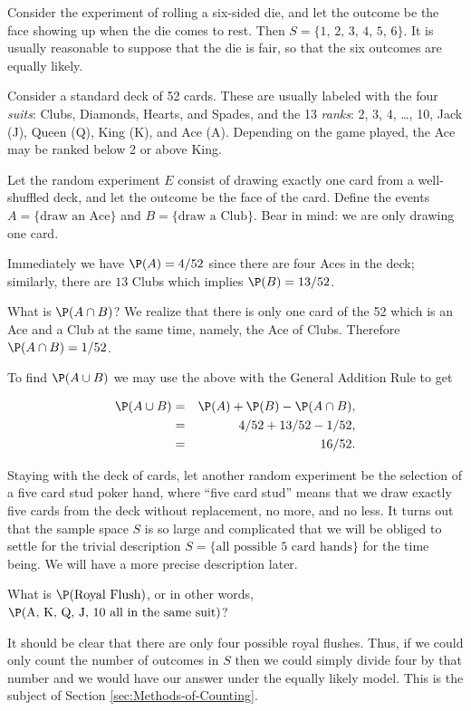 \documentclass[captions=tableheading]{scrbook}
\begin{document}
\begin{example}
Consider the experiment of rolling a six-sided die, and let the outcome be the face showing up when the die comes to rest. Then \( S = \{ 1,\,2,\,3,\,4,\,5,\,6 \} \). It is usually reasonable to suppose that the die is fair, so that the six outcomes are equally likely.
\end{example}

\begin{example}
Consider a standard deck of 52 cards. These are usually labeled with the four \emph{suits}: Clubs, Diamonds, Hearts, and Spades, and the 13 \emph{ranks}: 2, 3, 4, \ldots{}, 10, Jack (J), Queen (Q), King (K), and Ace (A). Depending on the game played, the Ace may be ranked below 2 or above King. 

Let the random experiment \(E\) consist of drawing exactly one card from a well-shuffled deck, and let the outcome be the face of the card. Define the events \( A = \{ \mbox{draw an Ace} \} \) and \( B = \{ \mbox{draw a Club} \} \). Bear in mind: we are only drawing one card.

Immediately we have \(\P(A)=4/52\) since there are four Aces in the deck; similarly, there are \(13\) Clubs which implies \(\P(B)=13/52\).

What is \(\P(A\cap B)\)? We realize that there is only one card of the 52 which is an Ace and a Club at the same time, namely, the Ace of Clubs. Therefore \(\P(A\cap B)=1/52\).

To find \(\P(A\cup B)\) we may use the above with the General Addition Rule to get

\begin{eqnarray*}
\P(A\cup B) & = & \P(A)+\P(B)-\P(A\cap B),\\
 & = & 4/52+13/52-1/52,\\
 & = & 16/52.
\end{eqnarray*}

\end{example}

\begin{example}
Staying with the deck of cards, let another random experiment be the selection of a five card stud poker hand, where ``five card stud'' means that we draw exactly five cards from the deck without replacement, no more, and no less. It turns out that the sample space \(S\) is so large and complicated that we will be obliged to settle for the trivial description \( S = \{ \mbox{all possible 5 card hands} \} \) for the time being. We will have a more precise description later.

What is \(\P(\mbox{Royal Flush})\), or in other words, \(\P(\mbox{A, K, Q, J, 10 all in the same suit})\)? 

It should be clear that there are only four possible royal flushes. Thus, if we could only count the number of outcomes in \(S\) then we could simply divide four by that number and we would have our answer under the equally likely model. This is the subject of Section \ref{sec:Methods-of-Counting}.

\end{example}
\end{document}
